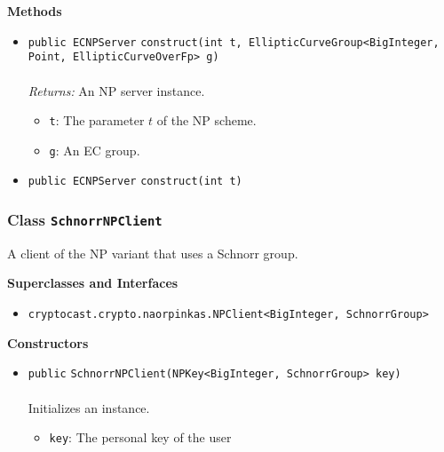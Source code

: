 \textbf{\sffamily Methods}
\begin{itemize}
\item \lstinline|public ECNPServer| \lstinline|construct|\lstinline|(int t, EllipticCurveGroup<BigInteger, Point, EllipticCurveOverFp> g)|\\ \\[-0.6em]
\emph{Returns:} An NP server instance.
\begin{itemize}
\item \lstinline|t|: The parameter $t$ of the NP scheme.
\item \lstinline|g|: An EC group.
\end{itemize}



\item \lstinline|public ECNPServer| \lstinline|construct|\lstinline|(int t)| \\[-0.6em]




\end{itemize}

\subsubsection{Class \lstinline|SchnorrNPClient|}
A client of the NP variant that uses a Schnorr group. \\
\noindent\begin{minipage}[t]{5cm}
\vspace{0.3em}
\hspace*{2em}
\vspace{0.3em}
\end{minipage}



\textbf{\sffamily Superclasses and Interfaces}
\begin{itemize}
\item \lstinline|cryptocast.crypto.naorpinkas.NPClient<BigInteger, SchnorrGroup>|
\end{itemize}


\textbf{\sffamily Constructors}
\begin{itemize}
\item \lstinline|public| \lstinline|SchnorrNPClient|\lstinline|(NPKey<BigInteger, SchnorrGroup> key)|\\ \\[-0.6em]
Initializes an instance.
\begin{itemize}
\item \lstinline|key|: The personal key of the user
\end{itemize}



\end{itemize}


